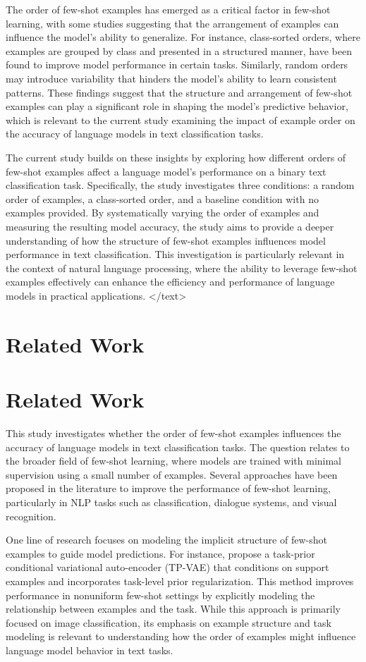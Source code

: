 \documentclass{article}
\begin{document}
The order of few-shot examples has emerged as a critical factor in few-shot learning, with some studies suggesting that the arrangement of examples can influence the model's ability to generalize. For instance, class-sorted orders, where examples are grouped by class and presented in a structured manner, have been found to improve model performance in certain tasks. Similarly, random orders may introduce variability that hinders the model's ability to learn consistent patterns. These findings suggest that the structure and arrangement of few-shot examples can play a significant role in shaping the model's predictive behavior, which is relevant to the current study examining the impact of example order on the accuracy of language models in text classification tasks.

The current study builds on these insights by exploring how different orders of few-shot examples affect a language model's performance on a binary text classification task. Specifically, the study investigates three conditions: a random order of examples, a class-sorted order, and a baseline condition with no examples provided. By systematically varying the order of examples and measuring the resulting model accuracy, the study aims to provide a deeper understanding of how the structure of few-shot examples influences model performance in text classification. This investigation is particularly relevant in the context of natural language processing, where the ability to leverage few-shot examples effectively can enhance the efficiency and performance of language models in practical applications.
</text>
\section{Related Work}
\section*{Related Work}

This study investigates whether the order of few-shot examples influences the accuracy of language models in text classification tasks. The question relates to the broader field of few-shot learning, where models are trained with minimal supervision using a small number of examples. Several approaches have been proposed in the literature to improve the performance of few-shot learning, particularly in NLP tasks such as classification, dialogue systems, and visual recognition.

One line of research focuses on modeling the implicit structure of few-shot examples to guide model predictions. For instance, \citet{2205.15014v1} propose a task-prior conditional variational auto-encoder (TP-VAE) that conditions on support examples and incorporates task-level prior regularization. This method improves performance in nonuniform few-shot settings by explicitly modeling the relationship between examples and the task. While this approach is primarily focused on image classification, its emphasis on example structure and task modeling is relevant to understanding how the order of examples might influence language model behavior in text tasks.
\end{document}
